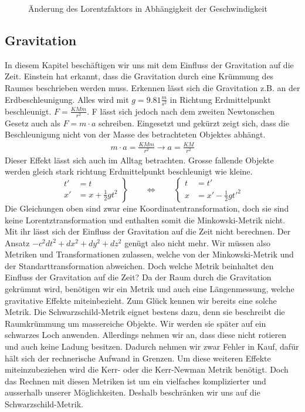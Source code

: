 \begin{refsection}
\begin{figure}[H]
    \caption{Änderung des Lorentzfaktors in Abh\"angigkeit der Geschwindigkeit}
        \label{skript:zeitreisen:fig:lorentz} 
\end{figure}
\subsection{Gravitation} \label{Gravitation}

	In diesem Kapitel beschäftigen wir uns mit dem Einfluss der Gravitation auf die Zeit. Einstein hat erkannt, dass die Gravitation durch eine Krümmung des Raumes beschrieben werden muss. Erkennen lässt sich die Gravitation z.B. an der Erdbeschleunigung. Alles wird mit $g=9.81\frac{m}{s^2}$ in Richtung Erdmittelpunkt beschleunigt. $F=\frac{KMm}{r^2}$. F lässt sich jedoch nach dem zweiten Newtonschen Gesetz auch als $F=m\cdot a$ schreiben. Eingesetzt und gekürzt zeigt sich, dass die Beschleunigung nicht von der Masse des betrachteten Objektes abhängt.
	\begin{align*}
		m\cdot a = \frac{KMm}{r^2} \rightarrow a=\frac{KM}{r^2} 
	\end{align*}
	Dieser Effekt lässt sich auch im Alltag betrachten. Grosse fallende Objekte werden gleich stark richtung Erdmittelpunkt beschleunigt wie kleine.
	\begin{equation}
	\left.
	\begin{aligned}
	t'&=t\\
	x'&=x+\frac12gt^2
	\end{aligned}
	\right\}
	\qquad
	\Leftrightarrow
	\qquad
	\left\{
	\begin{aligned}
	t&=t'\\
	x&=x'-\frac12gt'^2
	\end{aligned}
	\right.
	\end{equation}
	Die Gleichungen oben sind zwar eine Koordinatentransformation, doch sie sind keine Lorentztransformation und enthalten somit die Minkowski-Metrik nicht. Mit ihr lässt sich der Einfluss der Gravitation auf die Zeit nicht berechnen. 
	Der Ansatz $ -c^2dt^2 + dx^2 + dy^2 + dz^2$ genügt also nicht mehr. Wir müssen also Metriken und Transformationen zulassen, welche von der Minkowski-Metrik und der Standarttransformation abweichen.
	Doch welche Metrik beinhaltet den Einfluss der Gravitation auf die Zeit? 
	Da der Raum durch die Gravitation gekrümmt wird, benötigen wir ein Metrik und auch eine Längenmessung, welche gravitative Effekte miteinbezieht.
	Zum Glück kennen wir bereits eine solche Metrik. Die Schwarzschild-Metrik eignet bestens dazu, denn sie beschreibt die Raumkrümmung um massereiche Objekte. Wir werden sie später auf ein schwarzes Loch anwenden. Allerdings nehmen wir an, dass diese nicht rotieren und auch keine Ladung besitzen. Dadurch nehmen wir zwar Fehler in Kauf, dafür hält sich der rechnerische Aufwand in Grenzen. Um diese weiteren Effekte miteinzubeziehen wird die Kerr- oder die Kerr-Newman Metrik benötigt. Doch das Rechnen mit diesen Metriken ist um ein vielfaches komplizierter und ausserhalb unserer Möglichkeiten. Deshalb beschränken wir uns auf die Schwarzschild-Metrik.


\end{refsection}
